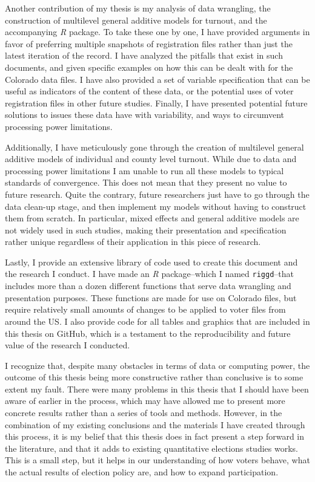 \documentclass[12pt,twoside]{reedthesis}
\begin{document}
  Another contribution of my thesis is my analysis of data wrangling, the
  construction of multilevel general additive models for turnout, and the
  accompanying \textit{R} package. To take these one by one, I have
  provided arguments in favor of preferring multiple snapshots of
  registration files rather than just the latest iteration of the record.
  I have analyzed the pitfalls that exist in such documents, and given
  specific examples on how this can be dealt with for the Colorado data
  files. I have also provided a set of variable specification that can be
  useful as indicators of the content of these data, or the potential uses
  of voter registration files in other future studies. Finally, I have
  presented potential future solutions to issues these data have with
  variability, and ways to circumvent processing power limitations.
  
  Additionally, I have meticulously gone through the creation of
  multilevel general additive models of individual and county level
  turnout. While due to data and processing power limitations I am unable
  to run all these models to typical standards of convergence. This does
  not mean that they present no value to future research. Quite the
  contrary, future researchers just have to go through the data clean-up
  stage, and then implement my models without having to construct them
  from scratch. In particular, mixed effects and general additive models
  are not widely used in such studies, making their presentation and
  specification rather unique regardless of their application in this
  piece of research.
  
  Lastly, I provide an extensive library of code used to create this
  document and the research I conduct. I have made an \textit{R}
  package--which I named \texttt{riggd}--that includes more than a dozen
  different functions that serve data wrangling and presentation purposes.
  These functions are made for use on Colorado files, but require
  relatively small amounts of changes to be applied to voter files from
  around the US. I also provide code for all tables and graphics that are
  included in this thesis on GitHub, which is a testament to the
  reproducibility and future value of the research I conducted.
  
  I recognize that, despite many obstacles in terms of data or computing
  power, the outcome of this thesis being more constructive rather than
  conclusive is to some extent my fault. There were many problems in this
  thesis that I should have been aware of earlier in the process, which
  may have allowed me to present more concrete results rather than a
  series of tools and methods. However, in the combination of my existing
  conclusions and the materials I have created through this process, it is
  my belief that this thesis does in fact present a step forward in the
  literature, and that it adds to existing quantitative elections studies
  works. This is a small step, but it helps in our understanding of how
  voters behave, what the actual results of election policy are, and how
  to expand participation.
  
\end{document}
